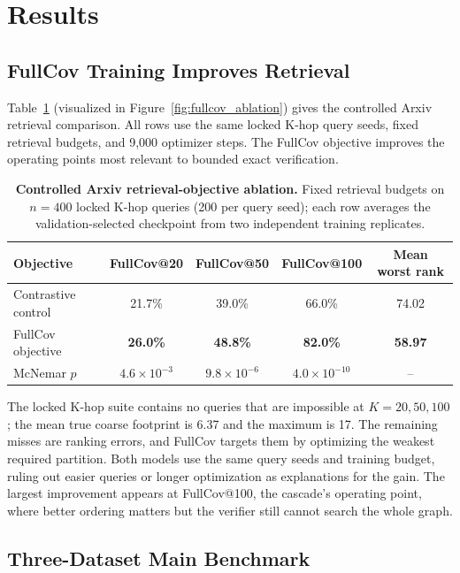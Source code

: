 \documentclass{article}
\begin{document}
\section{Results}

\subsection{FullCov Training Improves Retrieval}

Table~\ref{tab:loss_ablation} (visualized in Figure~\ref{fig:fullcov_ablation}) gives the controlled Arxiv retrieval comparison. All rows use the same locked K-hop query seeds, fixed retrieval budgets, and 9,000 optimizer steps. The FullCov objective improves the operating points most relevant to bounded exact verification.

\begin{table}[t]
\centering
\caption{\textbf{Controlled Arxiv retrieval-objective ablation.} Fixed retrieval budgets on $n{=}400$ locked K-hop queries (200 per query seed); each row averages the validation-selected checkpoint from two independent training replicates.}
\label{tab:loss_ablation}
\small
\setlength{\tabcolsep}{5pt}
\begin{tabular}{lcccc}
\toprule
\textbf{Objective} & \textbf{FullCov@20} & \textbf{FullCov@50} & \textbf{FullCov@100} & \textbf{Mean worst rank} \\
\midrule
Contrastive control & 21.7\% & 39.0\% & 66.0\% & 74.02 \\
FullCov objective & \textbf{26.0\%} & \textbf{48.8\%} & \textbf{82.0\%} & \textbf{58.97} \\
\midrule
McNemar $p$ & $4.6{\times}10^{-3}$ & $9.8{\times}10^{-6}$ & $4.0{\times}10^{-10}$ & -- \\
\bottomrule
\end{tabular}
\end{table}

The locked K-hop suite contains no queries that are impossible at $K=20,50,100$; the mean true coarse footprint is 6.37 and the maximum is 17. The remaining misses are ranking errors, and FullCov targets them by optimizing the weakest required partition. Both models use the same query seeds and training budget, ruling out easier queries or longer optimization as explanations for the gain. The largest improvement appears at FullCov@100, the cascade's operating point, where better ordering matters but the verifier still cannot search the whole graph.

\subsection{Three-Dataset Main Benchmark}
\label{sec:production}
\end{document}
